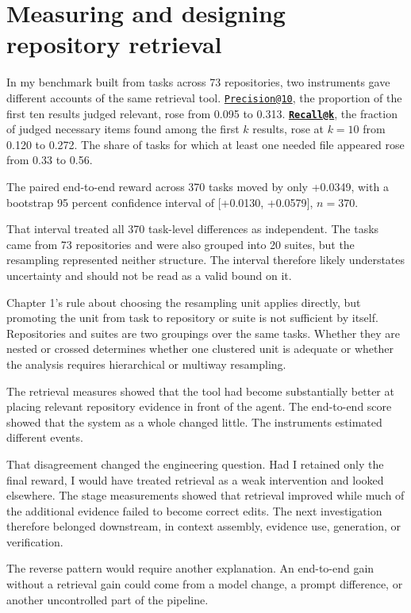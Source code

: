 \chapter{Measuring and designing repository retrieval}
\label{ch11-measuring-designing-repository-retrieval}
In my benchmark built from tasks across 73 repositories, two instruments gave different accounts of the same retrieval tool. \href{mailto:Precision@10}{\nolinkurl{Precision@10}}, the proportion of the first ten results judged relevant, rose from 0.095 to 0.313. \textbf{\href{mailto:Recall@k}{\nolinkurl{Recall@k}}}, the fraction of judged necessary items found among the first \(k\) results, rose at \(k = 10\) from 0.120 to 0.272. The share of tasks for which at least one needed file appeared rose from 0.33 to 0.56.

The paired end-to-end reward across 370 tasks moved by only +0.0349, with a bootstrap 95 percent confidence interval of {[}+0.0130, +0.0579{]}, \(n = 370\).

That interval treated all 370 task-level differences as independent. The tasks came from 73 repositories and were also grouped into 20 suites, but the resampling represented neither structure. The interval therefore likely understates uncertainty and should not be read as a valid bound on it.

Chapter 1's rule about choosing the resampling unit applies directly, but promoting the unit from task to repository or suite is not sufficient by itself. Repositories and suites are two groupings over the same tasks. Whether they are nested or crossed determines whether one clustered unit is adequate or whether the analysis requires hierarchical or multiway resampling.

The retrieval measures showed that the tool had become substantially better at placing relevant repository evidence in front of the agent. The end-to-end score showed that the system as a whole changed little. The instruments estimated different events.

That disagreement changed the engineering question. Had I retained only the final reward, I would have treated retrieval as a weak intervention and looked elsewhere. The stage measurements showed that retrieval improved while much of the additional evidence failed to become correct edits. The next investigation therefore belonged downstream, in context assembly, evidence use, generation, or verification.

The reverse pattern would require another explanation. An end-to-end gain without a retrieval gain could come from a model change, a prompt difference, or another uncontrolled part of the pipeline.

